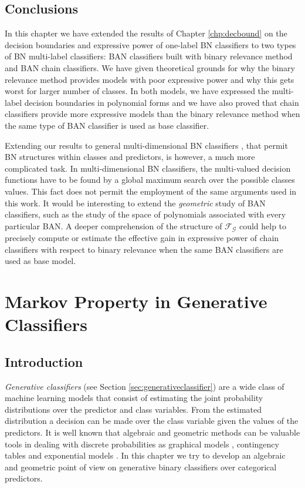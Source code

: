 \documentclass[11pt,a4paper, twoside]{book}
\begin{document}
\section{Conclusions}
\label{sec:conclusions}

In this chapter we have extended the results of Chapter \ref{chp:decbound} on the decision boundaries and expressive power of one-label BN classifiers to two types of BN multi-label classifiers: BAN classifiers built with binary relevance method and BAN chain classifiers.
We have given theoretical grounds for why the binary relevance method provides models with poor expressive power and why this gets worst for larger number of classes.
In both models, we have expressed the multi-label decision boundaries in polynomial forms and we have also proved that chain classifiers provide more expressive models than the binary relevance method when the same type of BAN classifier is used as base classifier. 

Extending our results to general multi-dimensional BN classifiers \citep{gaag2006,waal2007,bielza11d,read2013}, that permit BN structures within classes and predictors, is however, a much more complicated task. In multi-dimensional BN classifiers, the multi-valued decision functions have to be found by a global maximum search over the possible classes values. This fact does not permit the employment of the same arguments used in this work. 
It would be interesting to extend the \textit{geometric}  study of BAN classifiers, such as the study of the space of polynomials associated with every particular BAN. A deeper comprehension of the structure of $\mathcal{F}_{\mathcal{G}}$ could help to precisely compute or estimate the effective gain in expressive power of chain classifiers with respect to binary relevance when the same BAN classifiers are used as base model.


\chapter{Markov Property in Generative Classifiers}
\label{chp:genclas}
\section{Introduction}


\textit{Generative classifiers} (see Section \ref{sec:generativeclassifier}) are a wide class of machine learning models that consist of estimating the joint probability distributions over the predictor and class variables.  
From the estimated distribution a decision can be made over the class variable given the values of the predictors. 
It is well known that algebraic and geometric methods can be  valuable tools in dealing with discrete probabilities as graphical models \citep{GARCIA2005, Settimi1998},  contingency tables and exponential models \citep{Diaconis95, fienberg70}. 
In this chapter we try to develop an algebraic and geometric point of view on generative binary classifiers over categorical predictors. 
\end{document}
